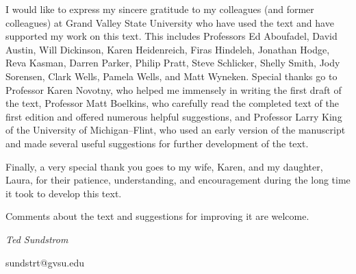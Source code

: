%
\vskip9pt
I would like to express my sincere gratitude to my colleagues (and former colleagues) at Grand Valley State University who have used the text and have supported my work on this text.  This includes Professors 
Ed Aboufadel, 
David Austin, 
Will Dickinson, 
Karen Heidenreich, 
Firas Hindeleh, 
Jonathan Hodge, 
Reva Kasman, 
Darren Parker, 
Philip Pratt, 
Steve Schlicker, 
Shelly Smith, 
Jody Sorensen, 
Clark Wells,  
Pamela Wells, and 
Matt Wyneken.  Special thanks go to Professor Karen Novotny, who helped me immensely in writing the first draft of the text, Professor Matt Boelkins, who carefully read the completed text of the first edition and offered numerous helpful suggestions, and Professor Larry King of the University of Michigan--Flint, who used an early version of the manuscript and made several useful suggestions for further development of the text.  

Finally, a very special thank you goes to my wife, Karen, and my daughter, Laura, for their patience, understanding, and encouragement during the long time it took to develop this text.

Comments about the text and suggestions for improving it are welcome.

\begin{flushright}
\emph{Ted Sundstrom}

sundstrt@gvsu.edu
\end{flushright}



\newpage
\thispagestyle{empty}

\endinput

